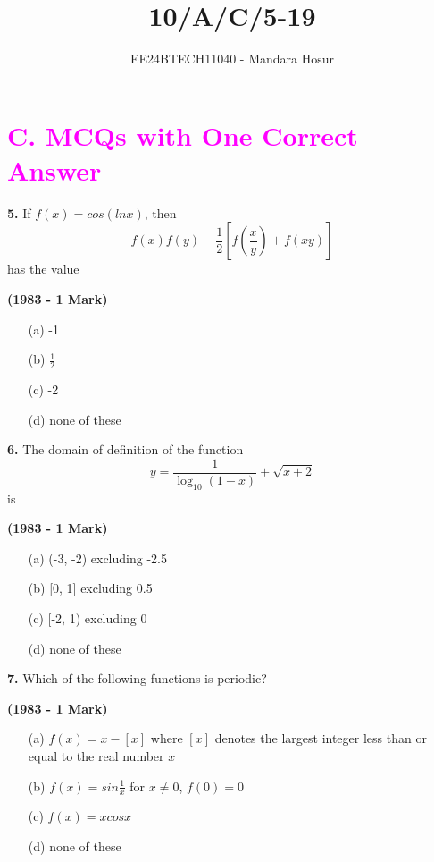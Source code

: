 \documentclass[journal,12pt,twocolumn]{IEEEtran}
\theoremstyle{remark}
\begin{document}

\vspace{3cm}

\title{10/A/C/5-19}
\author{EE24BTECH11040 - Mandara Hosur}
\maketitle
\newpage
\bigskip

\renewcommand{\thefigure}{\theenumi}
\renewcommand{\thetable}{\theenumi}

\section*{\textbf{\textcolor{magenta}{C. MCQs with One Correct Answer}}}

\textbf{5.} If $f(x) = cos(ln x)$, then $$f(x)f(y)-\frac{1}{2} \left[f\left(\frac{x}{y}\right)+f(xy)\right]$$ has the value

\hfill{\textbf{(1983 - 1 Mark)}}

\begin{multicols}{2}
	\begin{enumerate}
		\item[(a)] -1 
		\item[(b)] $\frac{1}{2}$
		\item[(c)] -2 
		\item[(d)] none of these
	\end{enumerate}
\end{multicols}

\textbf{6.} The domain of definition of the function
$$y = \frac{1}{\log_{10}{(1-x)}} + \sqrt{x+2}$$ is

\hfill{\textbf{(1983 - 1 Mark)}}

\begin{multicols}{2}
	\begin{enumerate}
		\item[(a)] (-3, -2) excluding -2.5 
		\item[(b)] [0, 1] excluding 0.5
		\item[(c)] [-2, 1) excluding 0 
		\item[(d)] none of these
	\end{enumerate}
\end{multicols}

\textbf{7.} Which of the following functions is periodic?

\hfill{\textbf{(1983 - 1 Mark)}}

\begin{enumerate}
\item[(a)] $f(x)=x-\left[x\right]$ where $\left[x\right]$ denotes the largest integer less than or equal to the real number $x$
\item[(b)] $f(x)=sin\frac{1}{x}$ for $x\neq0$, $f(0)=0$
\item[(c)] $f(x)=xcosx$
\item[(d)] none of these
\end{enumerate}
\end{document}
